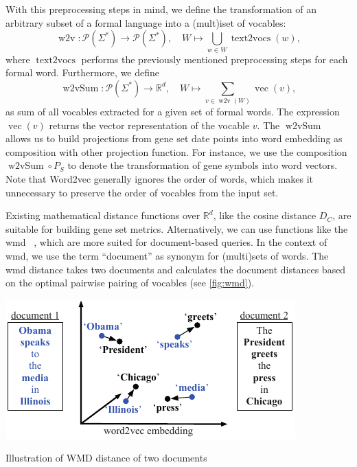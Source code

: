 \documentclass{thesisclass}
\DeclareMathOperator{\textToVocs}{text2vocs}
\DeclareMathOperator{\wToV}{w2v}
\DeclareMathOperator{\vecOp}{vec}
\DeclareMathOperator{\wToVSum}{w2vSum}
\begin{document}
With this preprocessing steps in mind, we define the transformation of an arbitrary subset of a formal language into a (mult)iset of vocables:
\begin{equation*}
		\wToV :  \mathcal{P}(\Sigma^*) \to \mathcal{P}(\Sigma^*), \quad W \mapsto \bigcup_{w \in W}  \textToVocs(w),
\end{equation*}
where $\textToVocs$ performs the previously mentioned preprocessing steps for each formal word. 
Furthermore, we define
\begin{equation*}
		\wToVSum :  \mathcal{P}(\Sigma^*) \to \mathbb{R}^d, \quad W \mapsto \sum_{v \in  \wToV(W)} \vecOp(v) ,
\end{equation*}
as sum of all vocables extracted for a given set of formal words. The expression $\vecOp(v)$ returns the vector representation of the vocable $v$. 
The $\wToVSum$ allows us to build projections from gene set date points into word embedding as composition with other projection function. 
For instance, we use the composition $\wToVSum \circ P_{S}$ to denote the transformation of gene symbols into word vectors. Note that Word2vec generally ignores the order of words, which makes it unnecessary to preserve the order of vocables from the input set.

Existing mathematical distance functions over $\mathbb{R}^d$, like the cosine distance $D_C$, are suitable for building gene set metrics. Alternatively, we can use functions like the \acrfull{wmd}~ \cite{Kusner:2015:WED:3045118.3045221}, which are more suited for document-based queries. 
In the context of \acrshort{wmd}, we use the term ``document'' as synonym for (multi)sets of words. 
The \acrshort{wmd} distance takes two documents and calculates the document distances based on the optimal pairwise pairing of vocables (see \cref{fig:wmd}).
\begin{centeredFigure}[!ht]
	\includegraphics{figures/materials/wmd.pdf}
	\caption{Illustration of WMD distance of two documents~\cite{Kusner:2015:WED:3045118.3045221}}
	\label{fig:wmd}
\end{centeredFigure}
\end{document}
